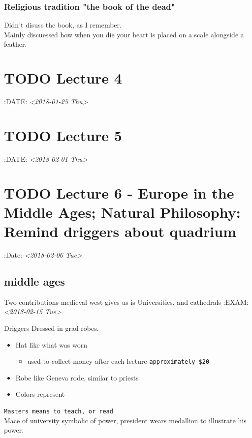 \documentclass[11pt]{article}
\begin{document}
\subsubsection{Religious tradition "the book of the dead"}
\label{sec-4-8-2}
Didn't disuss the book, as I remember.\\
    Mainly discuessed how when you die your heart is placed on a scale alongside a feather.





\section{{\bfseries\sffamily TODO} Lecture 4}
\label{sec-5}
:DATE: \textit{<2018-01-25 Thu>}

\section{{\bfseries\sffamily TODO} Lecture 5}
\label{sec-6}
:DATE: \textit{<2018-02-01 Thu>}

\section{{\bfseries\sffamily TODO} Lecture 6 - Europe in the Middle Ages; Natural Philosophy: Remind driggers about quadrium}
\label{sec-7}
:Date: \textit{<2018-02-06 Tue>}

\subsection{middle ages}
\label{sec-7-1}
Two contributions medieval west gives us is Universities, and cathedrals
:EXAM: \textit{<2018-02-15 Tue>}

Driggers Dressed in grad robes.\\
\begin{itemize}
\item Hat like what was worn
\begin{itemize}
\item used to collect money after each lecture \texttt{approximately \$20}
\end{itemize}

\item Robe like Geneva rode, similar to priests
\item Colors represent
\end{itemize}

\texttt{Masters means to teach, or read}\\
Mace of university symbolic of power, president wears medallion to illustrate his power.\\
\end{document}
